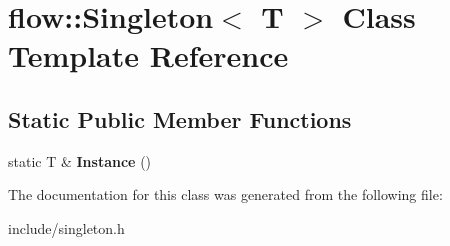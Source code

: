 \hypertarget{classflow_1_1_singleton}{}\section{flow\+:\+:Singleton$<$ T $>$ Class Template Reference}
\label{classflow_1_1_singleton}
\subsection*{Static Public Member Functions}
\begin{DoxyCompactItemize}
\item 
static T \& {\bfseries Instance} ()\hypertarget{classflow_1_1_singleton_acfb1cdfdbafdbb61f210c595c818ba5c}{}\label{classflow_1_1_singleton_acfb1cdfdbafdbb61f210c595c818ba5c}

\end{DoxyCompactItemize}


The documentation for this class was generated from the following file\+:\begin{DoxyCompactItemize}
\item 
include/singleton.\+h\end{DoxyCompactItemize}
